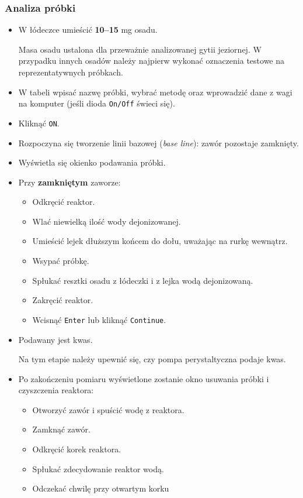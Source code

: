 \documentclass[
  letterpaper,
  DIV=11,
  numbers=noendperiod]{scrreprt}
\begin{document}
\hypertarget{analiza-pruxf3bki}{%
\subsubsection{Analiza próbki}\label{analiza-pruxf3bki}}

\begin{itemize}
\item
  W łódeczce umieścić \textbf{10--15} mg osadu.

  Masa osadu ustalona dla przeważnie analizowanej gytii jeziornej. W
  przypadku innych osadów należy najpierw wykonać oznaczenia testowe na
  reprezentatywnych próbkach.
\item
  W tabeli wpisać nazwę próbki, wybrać metodę oraz wprowadzić dane z
  wagi na komputer (jeśli dioda \texttt{On/Off} świeci się).
\item
  Kliknąć \texttt{ON}.
\item
  Rozpoczyna się tworzenie linii bazowej (\emph{base line}): zawór
  pozostaje zamknięty.
\item
  Wyświetla się okienko podawania próbki.
\item
  Przy \textbf{zamkniętym} zaworze:

  \begin{itemize}
  \item
    Odkręcić reaktor.
  \item
    Wlać niewielką ilość wody dejonizowanej.
  \item
    Umieścić lejek dłuższym końcem do dołu, uważając na rurkę wewnątrz.
  \item
    Wsypać próbkę.
  \item
    Spłukać resztki osadu z łódeczki i z lejka wodą dejonizowaną.
  \item
    Zakręcić reaktor.
  \item
    Wcisnąć \texttt{Enter} lub kliknąć \texttt{Continue}.
  \end{itemize}
\item
  Podawany jest kwas.

  Na tym etapie należy upewnić się, czy pompa perystaltyczna podaje
  kwas.
\item
  Po zakończeniu pomiaru wyświetlone zostanie okno usuwania próbki i
  czyszczenia reaktora:

  \begin{itemize}
  \item
    Otworzyć zawór i spuścić wodę z reaktora.
  \item
    Zamknąć zawór.
  \item
    Odkręcić korek reaktora.
  \item
    Spłukać zdecydowanie reaktor wodą.
  \item
    Odczekać chwilę przy otwartym korku


\end{itemize}
\end{itemize}
\end{document}
